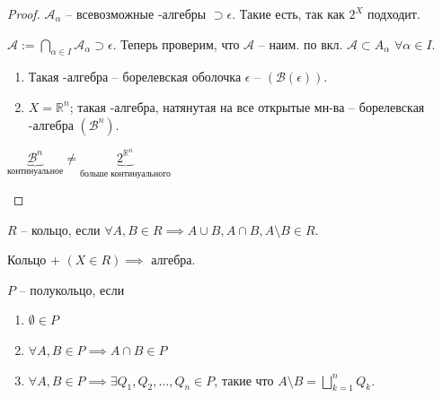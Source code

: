 \begin{proof}
    $\mathcal{A}_{\alpha}$ -- всевозможные \sigma-алгебры $\supset \epsilon$. Такие есть, так как $2^X$ подходит.

    $\mathcal{A} := \bigcap_{\alpha \in I} \mathcal{A}_{\alpha} \supset \epsilon$. Теперь проверим, что $\mathcal{A}$ -- наим. по вкл. $\mathcal{A} \subset A_{\alpha}$ $\forall \alpha \in I$.

    \begin{definition}
        \begin{enumerate}
            \item Такая \sigma-алгебра -- борелевская оболочка $\epsilon$ -- $(\mathcal{B}(\epsilon))$.
            
            \item $X = \mathbb{R}^n$; такая \sigma-алгебра, натянутая на все открытые мн-ва -- борелевская \sigma-алгебра $(\mathcal{B}^n)$.
        \end{enumerate}
    \end{definition}

    \begin{remark}
        $\underbrace{\mathcal{B}^n}_{\text{континуальное}} \neq \underbrace{2^{\mathbb{R}^n}}_{\text{больше континуального}}$
    \end{remark}
\end{proof}

\begin{definition}
    $R$ -- кольцо, если $\forall A, B \in R \implies A \cup B, A \cap B, A \setminus B \in R$.
\end{definition}

\begin{remark}
    Кольцо + $(X \in R) \implies$ алгебра.
\end{remark}

\begin{definition}
    $P$ -- полукольцо, если 
    \begin{enumerate}
        \item $\emptyset \in P$
        \item $\forall A, B \in P \implies A \cap B \in P$
        \item $\forall A, B \in P \implies \exists Q_1, Q_2, \dots, Q_n \in P$, такие что $A \setminus B = \bigsqcup_{k = 1}^{n}Q_k$.
    \end{enumerate}
\end{definition}

